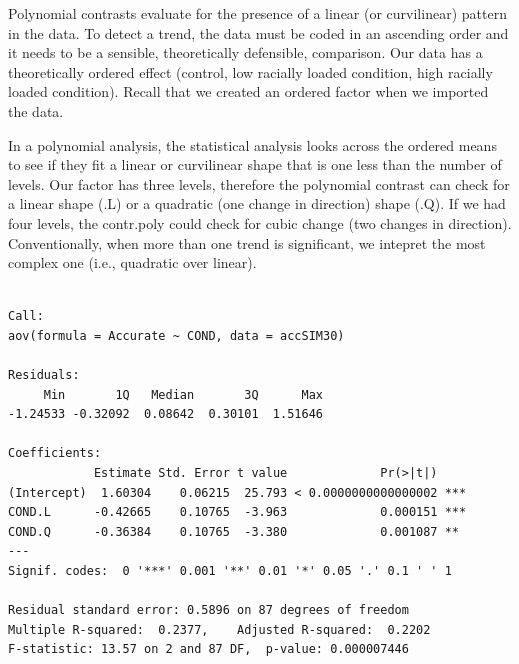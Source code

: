 \documentclass[
  11pt,
]{book}
\newenvironment{Shaded}{\begin{snugshade}}{\end{snugshade}}
\newcommand{\AttributeTok}[1]{\textcolor[rgb]{0.77,0.63,0.00}{#1}}
\newcommand{\DecValTok}[1]{\textcolor[rgb]{0.00,0.00,0.81}{#1}}
\newcommand{\FunctionTok}[1]{\textcolor[rgb]{0.00,0.00,0.00}{#1}}
\newcommand{\NormalTok}[1]{#1}
\newcommand{\OtherTok}[1]{\textcolor[rgb]{0.56,0.35,0.01}{#1}}
\newcommand{\SpecialCharTok}[1]{\textcolor[rgb]{0.00,0.00,0.00}{#1}}
\begin{document}
Polynomial contrasts evaluate for the presence of a linear (or curvilinear) pattern in the data. To detect a trend, the data must be coded in an ascending order and it needs to be a sensible, theoretically defensible, comparison. Our data has a theoretically ordered effect (control, low racially loaded condition, high racially loaded condition). Recall that we created an ordered factor when we imported the data.

In a polynomial analysis, the statistical analysis looks across the ordered means to see if they fit a linear or curvilinear shape that is one less than the number of levels. Our factor has three levels, therefore the polynomial contrast can check for a linear shape (.L) or a quadratic (one change in direction) shape (.Q). If we had four levels, the contr.poly could check for cubic change (two changes in direction). Conventionally, when more than one trend is significant, we intepret the most complex one (i.e., quadratic over linear).

\begin{Shaded}
\end{Shaded}

\begin{verbatim}

Call:
aov(formula = Accurate ~ COND, data = accSIM30)

Residuals:
     Min       1Q   Median       3Q      Max 
-1.24533 -0.32092  0.08642  0.30101  1.51646 

Coefficients:
            Estimate Std. Error t value             Pr(>|t|)    
(Intercept)  1.60304    0.06215  25.793 < 0.0000000000000002 ***
COND.L      -0.42665    0.10765  -3.963             0.000151 ***
COND.Q      -0.36384    0.10765  -3.380             0.001087 ** 
---
Signif. codes:  0 '***' 0.001 '**' 0.01 '*' 0.05 '.' 0.1 ' ' 1

Residual standard error: 0.5896 on 87 degrees of freedom
Multiple R-squared:  0.2377,    Adjusted R-squared:  0.2202 
F-statistic: 13.57 on 2 and 87 DF,  p-value: 0.000007446
\end{verbatim}
\end{document}
